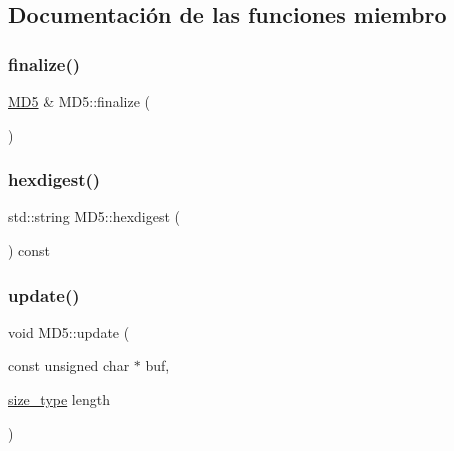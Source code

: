 \subsection{Documentación de las funciones miembro}
\mbox{\label{classMD5_a10f607494a3f2e3e515fc4b99d1a06cc}} 
\subsubsection{\texorpdfstring{finalize()}{finalize()}}
{\footnotesize\ttfamily \hyperlink{classMD5}{M\+D5} \& M\+D5\+::finalize (\begin{DoxyParamCaption}{ }\end{DoxyParamCaption})}

\mbox{\label{classMD5_aaf466f683b4bd8b1b66544f48bf09608}} 
\subsubsection{\texorpdfstring{hexdigest()}{hexdigest()}}
{\footnotesize\ttfamily std\+::string M\+D5\+::hexdigest (\begin{DoxyParamCaption}{ }\end{DoxyParamCaption}) const}

\mbox{\label{classMD5_ac5ddf6cd8f940422396d321ea90ed045}} 
\subsubsection{\texorpdfstring{update()}{update()}\hspace{0.1cm}{\footnotesize\ttfamily [1/2]}}
{\footnotesize\ttfamily void M\+D5\+::update (\begin{DoxyParamCaption}\item[{const unsigned char $\ast$}]{buf,  }\item[{\hyperlink{classMD5_aa836972700679dbcff6ae8337f6db464}{size\+\_\+type}}]{length }\end{DoxyParamCaption})}

\mbox{\label{classMD5_ac5ccba375539b993958fb235f8ac849c}} 
